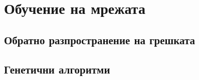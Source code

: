 \newpage
\chapter{Обучение на мрежата}
\label{chapter07}

\section{Обратно разпространение на грешката}

\section{Генетични алгоритми}
